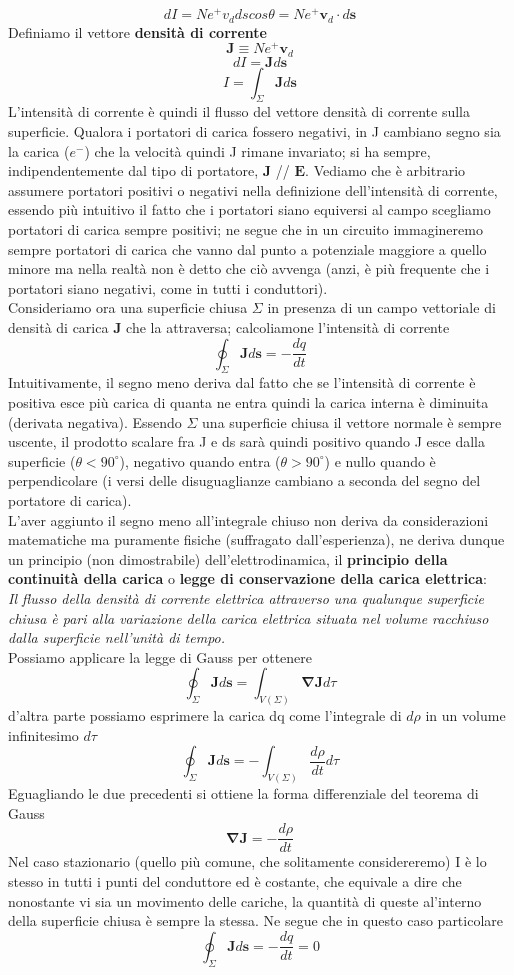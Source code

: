 \documentclass[10pt,a4paper]{article}
\begin{document}
\[dI = N e^+ v_d ds cos\theta = N e^+ \mathbf{v}_d\cdot d\mathbf{s}\]
Definiamo il vettore \textbf{densità di corrente}
\[\mathbf{J} \equiv N e^+ \mathbf{v}_d\]
\[dI = \mathbf{J}d\mathbf{s}\]
\[I = \int_{\Sigma} \mathbf{J}d\mathbf{s}\]
L'intensità di corrente è quindi il flusso del vettore densità di corrente sulla superficie. Qualora i portatori di carica fossero negativi, in J cambiano segno sia la carica (\(e^-\)) che la velocità quindi J rimane invariato; si ha sempre, indipendentemente dal tipo di portatore, \(\mathbf{J}\) // $\mathbf{E}$. Vediamo che è arbitrario assumere portatori positivi o negativi nella definizione dell'intensità di corrente, essendo più intuitivo il fatto che i portatori siano equiversi al campo scegliamo portatori di carica sempre positivi; ne segue che in un circuito immagineremo sempre portatori di carica che vanno dal punto a potenziale maggiore a quello minore ma nella realtà non è detto che ciò avvenga (anzi, è più frequente che i portatori siano negativi, come in tutti i conduttori). \\
Consideriamo ora una superficie chiusa $\Sigma$ in presenza di un campo vettoriale di densità di carica $\mathbf{J}$ che la attraversa; calcoliamone l'intensità di corrente
\[\oint_\Sigma \mathbf{J}d\mathbf{s} = -\frac{dq}{dt}\]
Intuitivamente, il segno meno deriva dal fatto che se l'intensità di corrente è positiva esce più carica di quanta ne entra quindi la carica interna è diminuita (derivata negativa). Essendo $\Sigma$ una superficie chiusa il vettore normale è sempre uscente, il prodotto scalare fra J e ds sarà quindi positivo quando J esce dalla superficie ($\theta<90^\circ$), negativo quando entra ($\theta>90^\circ$) e nullo quando è perpendicolare (i versi delle disuguaglianze cambiano a seconda del segno del portatore di carica).\\
L'aver aggiunto il segno meno all'integrale chiuso non deriva da considerazioni matematiche ma puramente fisiche (suffragato dall'esperienza), ne deriva dunque un principio (non dimostrabile) dell'elettrodinamica, il \textbf{principio della continuità della carica} o \textbf{legge di conservazione della carica elettrica}:\\
\textit{Il flusso della densità di corrente elettrica attraverso una qualunque superficie chiusa è pari alla variazione della carica elettrica situata nel volume racchiuso dalla superficie nell'unità di tempo.}\\
Possiamo applicare la legge di Gauss per ottenere
\[\oint_\Sigma \mathbf{J}d\mathbf{s} = \int_{V(\Sigma)} \mathbf{\nabla}\mathbf{J} d\tau\]
d'altra parte possiamo esprimere la carica dq come l'integrale di \(d\rho\) in un volume infinitesimo \(d\tau\) 
\[\oint_\Sigma \mathbf{J}d\mathbf{s} = -\int_{V(\Sigma)}\frac{d\rho}{dt}d\tau\]
Eguagliando le due precedenti si ottiene la forma differenziale del teorema di Gauss
\[\mathbf{\nabla}\mathbf{J} = -\frac{d\rho}{dt}\]
Nel caso stazionario (quello più comune, che solitamente considereremo) I è lo stesso in tutti i punti del conduttore ed è costante, che equivale a dire che nonostante vi sia un movimento delle cariche, la quantità di queste al'interno della superficie chiusa è sempre la stessa. Ne segue che in questo caso particolare 
\[\oint_\Sigma \mathbf{J}d\mathbf{s} = -\frac{dq}{dt} = 0\]
\end{document}
